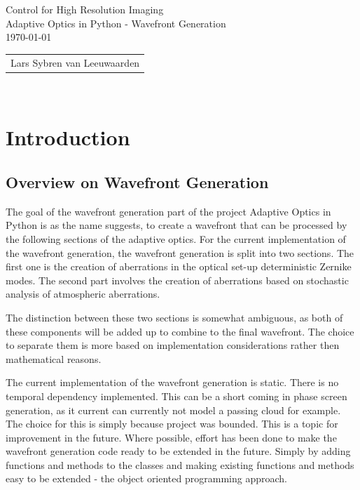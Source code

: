 \documentclass{article}
\begin{document}
\begin{titlepage}
  \begin{center}
   { \Huge Control for High Resolution Imaging} \\ 
   { \Large Adaptive Optics in Python - Wavefront Generation} \\   
   \vfill
   \today \\[1em]
   
   \begin{tabular}{c}
    Lars Sybren van Leeuwaarden\\
   \end{tabular}\\
  \end{center}
 \end{titlepage}
 
\tableofcontents

\newpage

\section{Introduction}
\subsection{Overview on Wavefront Generation}
The goal of the wavefront generation part of the project Adaptive Optics in Python is as the name suggests, to create a wavefront that can be processed by the following sections of the adaptive optics. For the current implementation of the wavefront generation, the wavefront generation is split into two sections. The first one is the creation of aberrations in the optical set-up deterministic Zernike modes. The second part involves the creation of aberrations based on stochastic analysis of atmospheric aberrations. 

The distinction between these two sections is somewhat ambiguous, as both of these components will be added up to combine to the final wavefront. The choice to separate them is more based on implementation considerations rather then mathematical reasons. 

The current implementation of the wavefront generation is static. There is no temporal dependency implemented. This can be a short coming in phase screen generation, as it current can currently not model a passing cloud for example. The choice for this is simply because project was bounded. This is a topic for improvement in the future. Where possible, effort has been done to make the wavefront generation code ready to be extended in the future. Simply by adding functions and methods to the classes and making existing functions and methods easy to be extended - the object oriented programming approach. 
\end{document}
